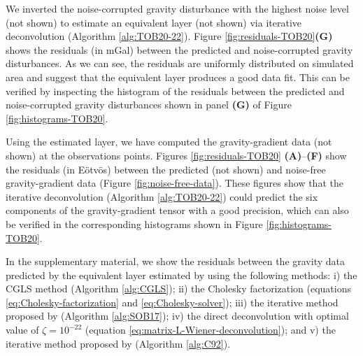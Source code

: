 We inverted the noise-corrupted gravity disturbance  with the highest noise level (not shown) 
to estimate an equivalent layer (not shown) via iterative deconvolution (Algorithm \ref{alg:TOB20-22}).
Figure \ref{fig:residuals-TOB20}\textbf{(G)} shows the residuals (in mGal) between the predicted and noise-corrupted 
gravity disturbances.
As we can see, the residuals are uniformly distributed on simulated area and suggest that the equivalent layer
produces a good data fit.
This can be verified by inspecting the histogram of the residuals between the predicted and noise-corrupted 
gravity disturbances shown in panel \textbf{(G)} of Figure \ref{fig:histograms-TOB20}.

Using the estimated layer, we have computed the gravity-gradient data (not shown) at the observations points.
Figures \ref{fig:residuals-TOB20} \textbf{(A)}--\textbf{(F)} show the residuals (in Eötvös)
between the predicted (not shown) and noise-free gravity-gradient data 
(Figure \ref{fig:noise-free-data}).
These figures show that the iterative deconvolution (Algorithm \ref{alg:TOB20-22}) could predict the six components of the
gravity-gradient tensor with a good precision, which can also be verified in the corresponding histograms shown in 
Figure \ref{fig:histograms-TOB20}.

In the supplementary material, we show the residuals between the gravity data predicted by the equivalent layer estimated by using the following methods:
i)  the CGLS method (Algorithm \ref{alg:CGLS});
ii) the  Cholesky factorization (equations \ref{eq:Cholesky-factorization} and \ref{eq:Cholesky-solver});
iii) the iterative method proposed by \citet{siqueira-etal2017} (Algorithm \ref{alg:SOB17});
iv) the direct deconvolution with  optimal value of $\zeta = 10^{-22}$ 
(equation \ref{eq:matrix-L-Wiener-deconvolution}); and
v) the iterative method  proposed by \cite{cordell1992} (Algorithm \ref{alg:C92}).



